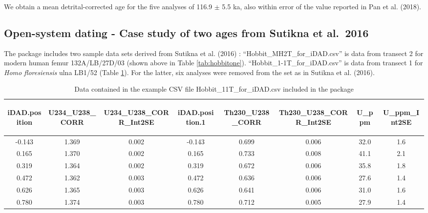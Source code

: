 \documentclass[]{elsarticle} %
\begin{document}
We obtain a mean detrital-corrected age for the five analyses of 116.9 \(\pm\) 5.5 ka, also within error of the value reported in Pan et al. (2018).

\hypertarget{open-system-dating---case-study-of-two-ages-from-sutikna-et-al.-2016}{%
\subsection{Open-system dating - Case study of two ages from Sutikna et al.~2016}\label{open-system-dating---case-study-of-two-ages-from-sutikna-et-al.-2016}}

The package includes two sample data sets derived from Sutikna et al. (2016) : ``Hobbit\_MH2T\_for\_iDAD.csv'' is data from transect 2 for modern human femur 132A/LB/27D/03 (shown above in Table \ref{tab:hobbitone}). ``Hobbit\_1-1T\_for\_iDAD.csv'' is data from transect 1 for \emph{Homo floresiensis} ulna LB1/52 (Table \ref{tab:table-human}). For the latter, six analyses were removed from the set as in Sutikna et al. (2016).

\begin{table}[ht]
\centering
\begin{tabular}{cccccccc}
  \hline
\begin{sideways} iDAD.position \end{sideways} & \begin{sideways} U234\_U238\_CORR \end{sideways} & \begin{sideways} U234\_U238\_CORR\_Int2SE \end{sideways} & \begin{sideways} iDAD.position.1 \end{sideways} & \begin{sideways} Th230\_U238\_CORR \end{sideways} & \begin{sideways} Th230\_U238\_CORR\_Int2SE \end{sideways} & \begin{sideways} U\_ppm \end{sideways} & \begin{sideways} U\_ppm\_Int2SE \end{sideways} \\ 
  \hline
-0.143 & 1.369 & 0.002 & -0.143 & 0.699 & 0.006 & 32.0 & 1.6 \\ 
  0.165 & 1.370 & 0.002 & 0.165 & 0.733 & 0.008 & 41.1 & 2.1 \\ 
  0.319 & 1.364 & 0.002 & 0.319 & 0.672 & 0.006 & 35.8 & 1.8 \\ 
  0.472 & 1.362 & 0.003 & 0.472 & 0.636 & 0.006 & 27.6 & 1.4 \\ 
  0.626 & 1.365 & 0.003 & 0.626 & 0.641 & 0.006 & 31.0 & 1.6 \\ 
  0.780 & 1.374 & 0.003 & 0.780 & 0.712 & 0.005 & 27.9 & 1.4 \\ 
   \hline
\end{tabular}
\caption{\label{tab:table-human}Data contained in the example CSV file Hobbit\_1\-1T\_for\_iDAD.csv included in the package} 
\end{table}
\end{document}
